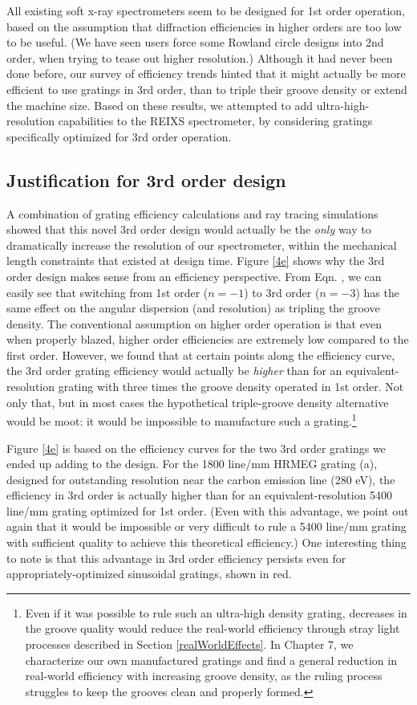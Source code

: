 All existing soft x-ray spectrometers seem to be designed for 1st order operation, based on the assumption that diffraction efficiencies in higher orders are too low to be useful.  (We have seen users force some Rowland circle designs into 2nd order, when trying to tease out higher resolution.)  Although it had never been done before, our survey of efficiency trends hinted that it might actually be more efficient to use gratings in 3rd order, than to triple their groove density or extend the machine size.  Based on these results, we attempted to add ultra-high-resolution capabilities to the REIXS spectrometer, by considering gratings specifically optimized for 3rd order operation.

\subsection{Justification for 3rd order design}
A combination of grating efficiency calculations and ray tracing simulations showed that this novel 3rd order design would actually be the \emph{only} way to dramatically increase the resolution of our spectrometer, within the mechanical length constraints that existed at design time.  Figure \ref{4e} shows why the 3rd order design makes sense from an efficiency perspective.  From Eqn. , we can easily see that switching from 1st order ($n=-1$) to 3rd order ($n=-3$) has the same effect on the angular dispersion (and resolution) as tripling the groove density.  The conventional assumption on higher order operation is that even when properly blazed, higher order efficiencies are extremely low compared to the first order.  However, we found that at certain points along the efficiency curve, the 3rd order grating efficiency would actually be \emph{higher} than for an equivalent-resolution grating with three times the groove density operated in 1st order.  Not only that, but in most cases the hypothetical triple-groove density alternative would be moot: it would be impossible to manufacture such a grating.\footnote{Even if it was possible to rule such an ultra-high density grating, decreases in the groove quality would reduce the real-world efficiency through stray light processes described in Section \ref{realWorldEffects}.  In Chapter 7, we characterize our own manufactured gratings and find a general reduction in real-world efficiency with increasing groove density, as the ruling process struggles to keep the grooves clean and properly formed.}

Figure \ref{4e} is based on the efficiency curves for the two 3rd order gratings we ended up adding to the design.  For the 1800 line/mm HRMEG grating (a), designed for outstanding resolution near the carbon emission line (280 eV), the efficiency in 3rd order is actually higher than for an equivalent-resolution 5400 line/mm grating optimized for 1st order.  (Even with this advantage, we point out again that it would be impossible or very difficult to rule a 5400 line/mm grating with sufficient quality to achieve this theoretical efficiency.)  One interesting thing to note is that this advantage in 3rd order efficiency persists even for appropriately-optimized sinusoidal gratings, shown in red.

